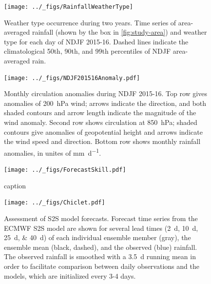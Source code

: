 \documentclass[twocol]{ametsoc}
\begin{document}
\begin{figure}
	\noindent\texttt{[image: ../\_figs/RainfallWeatherType]}
	\caption{
		Weather type occurrence during two years.
		Time series of area-averaged rainfall (shown by the box in \cref{fig:study-area}) and weather type for each day of NDJF  2015-16.
		Dashed lines indicate the climatological 50th, 90th, and 99th percentiles of NDJF area-averaged rain.
	}
  \label{fig:klee}
\end{figure}

\begin{figure}
	\noindent\texttt{[image: ../\_figs/NDJF201516Anomaly.pdf]}
	\caption{
    	Monthly circulation anomalies during NDJF 2015-16.
      Top row gives anomalies of \SI{200}{\hecto\pascal} wind; arrows indicate the direction, and both shaded contours and arrow length indicate the magnitude of the wind anomaly.
      Second row shows circulation at \SI{850}{\hecto\pascal}; shaded contours give anomalies of geopotential height and arrows indicate the wind speed and direction.
      Bottom row shows monthly rainfall anomalies, in unites of \si{\milli\meter\per\day}.
	}
  \label{fig:anomalies}
\end{figure}

\begin{figure}
	\noindent\texttt{[image: ../\_figs/ForecastSkill.pdf]}
	\caption{
		caption
	}
  \label{fig:subsprobfcst}
\end{figure}

\begin{figure}
	\noindent\texttt{[image: ../\_figs/Chiclet.pdf]}
	\caption{
    Assessment of S2S model forecasts.
    Forecast time series from the ECMWF S2S model are shown for several lead times (\SIlist{2;10;25;40}{\day}) of each individual ensemble member (gray), the ensemble mean (black, dashed), and the observed (blue) rainfall.
		The observed rainfall is smoothed with a \SI{3.5}{\day} running mean in order to facilitate comparison between daily observations and the models, which are initialized every 3-4 days.
	}
  \label{fig:chiclet}
\end{figure}
\end{document}
